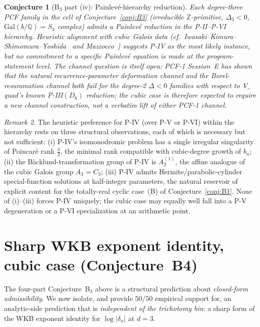 \documentclass[11pt,a4paper]{article}
\newtheorem{conjecture}{Conjecture}
\theoremstyle{definition}
\theoremstyle{remark}
\newtheorem{remark}[conjecture]{Remark}
\newcommand{\Q}{\mathbb{Q}}
\newcommand{\Z}{\mathbb{Z}}
\newcommand{\Gal}{\mathrm{Gal}}
\begin{document}
\begin{conjecture}[B$_{3}$ part (iv): Painlev\'e-hierarchy reduction]\label{conj:B3iv}
Each degree-three PCF family in the cell of Conjecture~\ref{conj:B3}
(irreducible $\Z$-primitive, $\Delta_{3}<0$, $\Gal(b/\Q)=S_{3}$ complex)
admits a Painlev\'e reduction in the P-II--P-VI hierarchy. Heuristic
alignment with cubic Galois data
(cf.~Iwasaki--Kimura--Shimomura--Yoshida~\cite{Iwasaki1991} and
Mazzocco~\cite{Mazzocco2003}) suggests P-IV as the most likely
instance, but no commitment to a specific Painlev\'e equation is made
at the program-statement level. The channel question is itself open:
PCF-1 Session~E has shown that the natural recurrence-parameter
deformation channel and the Borel-resummation channel both
\emph{fail} for the degree-2 $\Delta<0$ families with respect to
V$\_$quad's known P-III$(D_{6})$ reduction; the cubic case is
therefore expected to require a new channel construction, not a
verbatim lift of either PCF-1 channel.
\end{conjecture}

\begin{remark}\label{rem:painleveIV}
The heuristic preference for P-IV (over P-V or P-VI) within the
hierarchy rests on three structural observations, each of which is
necessary but not sufficient: (i) P-IV's isomonodromic problem has a
single irregular singularity of Poincar\'e rank $\frac{3}{2}$, the
minimal rank compatible with cubic-degree growth of $b_{n}$;
(ii) the B\"acklund-transformation group of P-IV is $A_{2}^{(1)}$, the
affine analogue of the cubic Galois group $A_{3}=C_{3}$;
(iii) P-IV admits Hermite/parabolic-cylinder special-function solutions
at half-integer parameters, the natural reservoir of explicit content
for the totally-real cyclic case~(B) of Conjecture~\ref{conj:B1}. None
of (i)--(iii) forces P-IV uniquely; the cubic case may equally well
fall into a P-V degeneration or a P-VI specialization at an
arithmetic point.
\end{remark}

\section{Sharp WKB exponent identity, cubic case (Conjecture~B4)}\label{sec:B4}

The four-part Conjecture~B$_{3}$ above is a structural prediction
about \emph{closed-form admissibility}. We now isolate, and provide
$50/50$ empirical support for, an analytic-side prediction that is
\emph{independent of the trichotomy bin}: a sharp form of the WKB
exponent identity for $\log|\delta_{n}|$ at $d=3$.
\end{document}
